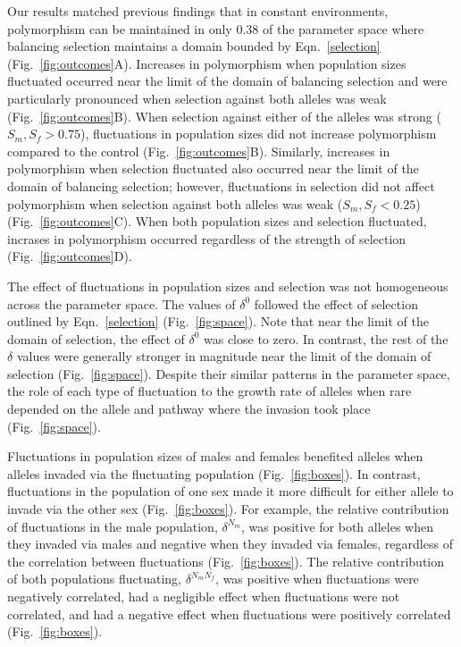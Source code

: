 \documentclass[12pt]{article}
\begin{document}
Our results matched previous findings that in constant environments, polymorphism can be maintained in only $ 0.38$ of the parameter space where balancing selection maintains a domain bounded by Eqn.~\ref{selection} (Fig.~\ref{fig:outcomes}A). Increases in polymorphism when population sizes fluctuated occurred near the limit of the domain of balancing selection and were particularly pronounced when selection against both alleles was weak (Fig.~\ref{fig:outcomes}B). When selection against either of the alleles was strong ($ S_{m}, S_{f}> 0.75 $), fluctuations in population sizes did not increase polymorphism compared to the control (Fig.~\ref{fig:outcomes}B). Similarly, increases in polymorphism when selection fluctuated also occurred near the limit of the domain of balancing selection; however, fluctuations in selection did not affect polymorphism when selection against both alleles was weak ($ S_{m}, S_{f}< 0.25 $) (Fig.~\ref{fig:outcomes}C). When both population sizes and selection fluctuated, incrases in polymorphism occurred regardless of the strength of selection (Fig.~\ref{fig:outcomes}D).

The effect of fluctuations in population sizes and selection was not homogeneous across the parameter space. The values of $\delta^{0}$ followed the effect of selection outlined by Eqn.~\ref{selection} (Fig.~\ref{fig:space}). Note that near the limit of the domain of selection, the effect of $\delta^{0}$ was close to zero. In contrast, the rest of the $\delta$ values were generally stronger in magnitude near the limit of the domain of selection  (Fig.~\ref{fig:space}). Despite their similar patterns in the parameter space, the role of each type of fluctuation to the growth rate of alleles when rare depended on the allele and pathway where the invasion took place (Fig.~\ref{fig:space}).

Fluctuations in population sizes of males and females benefited alleles when alleles invaded via the fluctuating population (Fig.~\ref{fig:boxes}). In contrast, fluctuations in the population of one sex made it more difficult for either allele to invade via the other sex (Fig.~\ref{fig:boxes}). For example, the relative contribution of fluctuations in the male population, $\delta^{N_{m}}$, was positive for both alleles when they invaded via males and negative when they invaded via females, regardless of the correlation between fluctuations (Fig.~\ref{fig:boxes}). The relative contribution of both populations fluctuating,  $\delta^{N_{m}N_{f}}$, was positive when fluctuations were negatively correlated, had a negligible effect when fluctuations were not correlated, and had a negative effect when fluctuations were positively correlated (Fig.~\ref{fig:boxes}).
\end{document}
